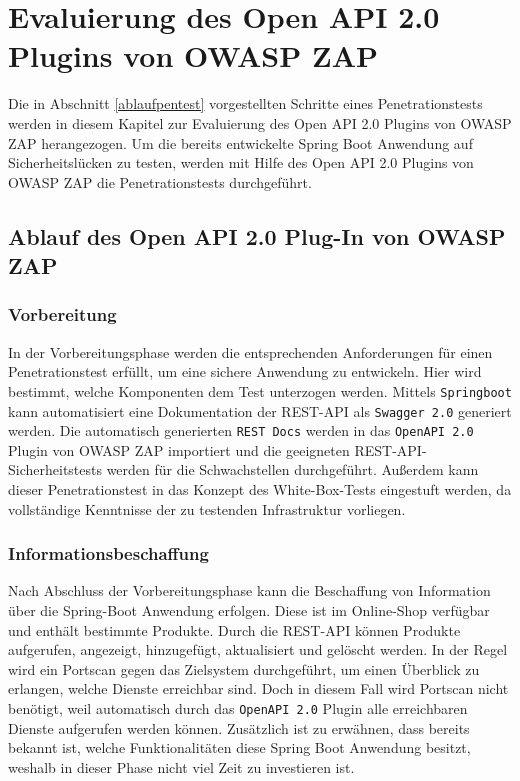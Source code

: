 \chapter{Evaluierung des Open API 2.0 Plugins von OWASP ZAP}
\label{cha:k5}

Die in Abschnitt \ref{ablaufpentest} vorgestellten Schritte eines Penetrationstests werden in diesem Kapitel zur Evaluierung des Open API 2.0 Plugins von OWASP ZAP herangezogen. Um die bereits entwickelte Spring Boot Anwendung auf Sicherheitslücken zu testen, werden mit Hilfe des Open API 2.0 Plugins von OWASP ZAP die Penetrationstests durchgeführt.

\section{Ablauf des Open API 2.0 Plug-In von OWASP ZAP}

\subsection{Vorbereitung}

In der Vorbereitungsphase werden die entsprechenden Anforderungen für einen Penetrationstest erfüllt, um eine sichere Anwendung zu entwickeln. Hier wird bestimmt, welche Komponenten dem Test unterzogen werden. Mittels \texttt{Springboot} kann automatisiert eine Dokumentation der REST-API als \texttt{Swagger 2.0} generiert werden. Die automatisch generierten \texttt{REST Docs} werden in das \texttt{OpenAPI 2.0} Plugin von OWASP ZAP importiert und die geeigneten REST-API-Sicherheitstests werden für die Schwachstellen durchgeführt. Außerdem kann dieser Penetrationstest in das Konzept des White-Box-Tests eingestuft werden, da vollständige Kenntnisse der zu testenden Infrastruktur vorliegen.

\subsection{Informationsbeschaffung}

Nach Abschluss der Vorbereitungsphase kann die Beschaffung von Information über die Spring-Boot Anwendung erfolgen. Diese ist im Online-Shop verfügbar und enthält bestimmte Produkte. Durch die REST-API können Produkte aufgerufen, angezeigt, hinzugefügt, aktualisiert und gelöscht werden. In der Regel wird ein Portscan gegen das Zielsystem durchgeführt, um einen Überblick zu erlangen, welche Dienste erreichbar sind. Doch in diesem Fall wird Portscan nicht benötigt, weil automatisch durch das \texttt{OpenAPI 2.0} Plugin alle erreichbaren Dienste aufgerufen werden können. Zusätzlich ist zu erwähnen, dass bereits bekannt ist, welche Funktionalitäten diese Spring Boot Anwendung besitzt, weshalb in dieser Phase nicht viel Zeit zu investieren ist.

